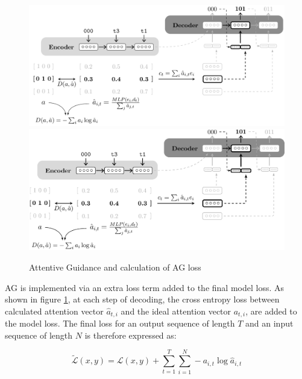 \begin{figure}
	\begin{minipage}[t]{\textwidth}
		\ifpdf
		\includegraphics[width=\linewidth,keepaspectratio=true]{./figs/ag-model-pdf}
		\else
		\includegraphics[width=\linewidth,keepaspectratio=true]{./figs/ag-model-eps}
		\fi
		\caption{\small Attentive Guidance and calculation of AG loss \citep{Hupkes2018}}
		\label{pm:ag-loss}
	\end{minipage}
\end{figure}

AG is implemented via an extra loss term added to the final model loss. As shown in figure \ref{pm:ag-loss}, at each step of decoding, the cross entropy loss between calculated attention vector $\hat{a}_{t,i}$ and the ideal attention vector $a_{t,i}$, are added to the model loss. The final loss for an output sequence of length $T$ and an input sequence of length $N$ is therefore expressed as:

\begin{equation}\label{eqn:ag}
\widetilde{\mathcal{L}}(x,y) = \mathcal{L}(x,y) + \sum_{t=1}^T \sum_{i=1}^N -a_{i,t}\log\hat{a}_{i,t}
\end{equation}

